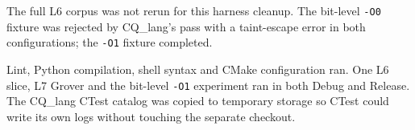 

The full L6 corpus was not rerun for this harness cleanup. The bit-level
\texttt{-O0} fixture was rejected by CQ\_lang's pass with a taint-escape
error in both configurations; the \texttt{-O1} fixture completed.

Lint, Python compilation, shell syntax and CMake configuration ran.
One L6 slice, L7 Grover and the bit-level \texttt{-O1} experiment ran
in both Debug and Release. The CQ\_lang CTest catalog was copied to
temporary storage so CTest could write its own logs without touching
the separate checkout.

